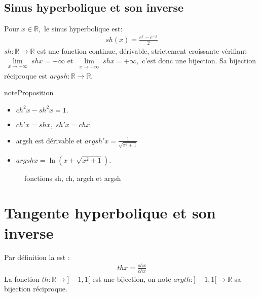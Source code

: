 \documentclass[letterpaper,10pt,french]{jupyterBook}
\let\sphinxpxdimen\pdfpxdimen\else\newdimen\sphinxpxdimen
\begin{document}
\subsection{Sinus hyperbolique et son inverse}
\label{\detokenize{fcthycerinvs:sinus-hyperbolique-et-son-inverse}}
\sphinxAtStartPar
Pour \(x\in \mathbb{R},\) le sinus hyperbolique est:
\begin{equation*}
\begin{split}
sh(x)=\frac{e^x-e^{-x}}{2}
\end{split}
\end{equation*}
\sphinxAtStartPar
\(sh:\mathbb{R}\rightarrow\mathbb{R}\) est une fonction continue, dérivable, strictement croissante vérifiant \(\lim\limits_{\substack{x\rightarrow-\infty}}shx=-\infty\) et \(\lim\limits_{\substack{x\rightarrow+\infty}}shx=+\infty,\)  c’est donc une bijection. Sa bijection réciproque est \(argsh:\mathbb{R}\rightarrow \mathbb{R}.\)

\begin{sphinxadmonition}{note}{Proposition}
\begin{itemize}
\item {} 
\sphinxAtStartPar
\(ch^2 x - sh^2 x=1.\)

\item {} 
\sphinxAtStartPar
\(ch'x = shx, \;sh'x = chx.\)

\item {} 
\sphinxAtStartPar
argsh est dérivable et \(argsh'x=\frac{1}{\sqrt{x^2+1}}\)

\item {} 
\sphinxAtStartPar
\(argshx = \ln(x+\sqrt{x^2 +1}).\)

\end{itemize}
\end{sphinxadmonition}

\begin{figure}[htbp]
\centering
\capstart

\noindent\sphinxincludegraphics[height=150\sphinxpxdimen]{{sh-ch}.png}
\caption{fonctions sh, ch, argch et argsh}\label{\detokenize{fcthycerinvs:id1}}\end{figure}


\section{Tangente hyperbolique et son inverse}
\label{\detokenize{fcthycerinvs:tangente-hyperbolique-et-son-inverse}}
\sphinxAtStartPar
Par définition la  est :
\begin{equation*}
\begin{split}
th x=\frac{sh x}{ch x}
\end{split}
\end{equation*}
\sphinxAtStartPar
La fonction \(th :\mathbb{R}\rightarrow]-1,1[\) est une bijection, on note \(argth :]-1,1[\rightarrow\mathbb{R}\) sa bijection réciproque.
\end{document}
